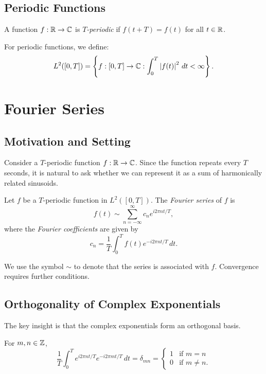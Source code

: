 \begin{notechapter}
\subsection{Periodic Functions}

\begin{definition}
A function $f:\mathbb{R} \to \mathbb{C}$ is \emph{$T$-periodic} if $f(t+T) = f(t)$ for all $t \in \mathbb{R}$.
\end{definition}

For periodic functions, we define:
\[
L^2([0,T]) = \left\{ f:[0,T] \to \mathbb{C} : \int_0^T \left|f(t)\right|^2 \, dt < \infty \right\}.
\]

\section{Fourier Series}

\subsection{Motivation and Setting}

Consider a $T$-periodic function $f:\mathbb{R} \to \mathbb{C}$. Since the function repeats every $T$ seconds, it is natural to ask whether we can represent it as a sum of harmonically related sinusoids.

\begin{definition}
Let $f$ be a $T$-periodic function in $L^2([0,T])$. The \emph{Fourier series} of $f$ is
\[
f(t) \sim \sum_{n=-\infty}^{\infty} c_n e^{i 2\pi n t/T},
\]
where the \emph{Fourier coefficients} are given by
\[
c_n = \frac{1}{T} \int_0^T f(t) e^{-i 2\pi n t/T} \, dt.
\]
\end{definition}

\begin{remark}
We use the symbol $\sim$ to denote that the series is associated with $f$. Convergence requires further conditions.
\end{remark}

\subsection{Orthogonality of Complex Exponentials}

The key insight is that the complex exponentials form an orthogonal basis.

\begin{lemma}[Orthogonality]
For $m, n \in \mathbb{Z}$,
\[
\frac{1}{T}\int_0^T e^{i 2\pi n t/T} e^{-i 2\pi m t/T} \, dt = \delta_{mn} = \begin{cases}
1 & \text{if } m = n \\
0 & \text{if } m \neq n.
\end{cases}
\]
\end{lemma}


\end{notechapter}
